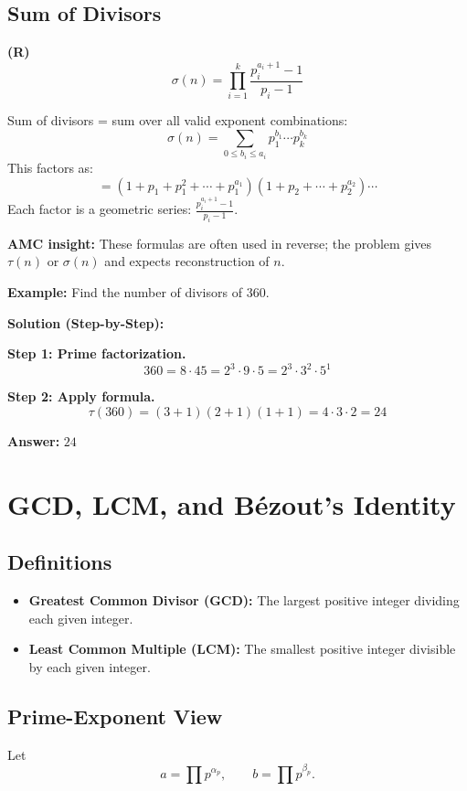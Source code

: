 \documentclass[12pt]{extarticle}
\begin{document}
\subsection*{Sum of Divisors}
\textbf{(R)}
\[
\sigma(n) = \prod_{i=1}^k \frac{p_i^{a_i+1}-1}{p_i-1}
\]

\begin{conceptbox}[Derivation]
Sum of divisors = sum over all valid exponent combinations:
\[
\sigma(n) = \sum_{0 \le b_i \le a_i} p_1^{b_1} \cdots p_k^{b_k}
\]
This factors as:
\[
= (1+p_1+p_1^2+\cdots+p_1^{a_1})(1+p_2+\cdots+p_2^{a_2})\cdots
\]
Each factor is a geometric series: $\frac{p_i^{a_i+1}-1}{p_i-1}$.
\end{conceptbox}

\begin{remarkbox}
\textbf{AMC insight:} These formulas are often used in reverse; the problem gives $\tau(n)$ or $\sigma(n)$ and expects reconstruction of $n$.
\end{remarkbox}

\begin{examplebox}
\textbf{Example:} Find the number of divisors of $360$.

\textbf{Solution (Step-by-Step):}

\textbf{Step 1: Prime factorization.}
\[
360 = 8 \cdot 45 = 2^3 \cdot 9 \cdot 5 = 2^3 \cdot 3^2 \cdot 5^1
\]

\textbf{Step 2: Apply formula.}
\[
\tau(360) = (3+1)(2+1)(1+1) = 4 \cdot 3 \cdot 2 = 24
\]

\textbf{Answer:} $\boxed{24}$
\end{examplebox}

\section{GCD, LCM, and Bézout’s Identity}

\subsection*{Definitions}
\begin{itemize}
\item \textbf{Greatest Common Divisor (GCD):} The largest positive integer dividing each given integer.
\item \textbf{Least Common Multiple (LCM):} The smallest positive integer divisible by each given integer.
\end{itemize}

\subsection*{Prime-Exponent View}
Let
\[
a=\prod p^{\alpha_p}, \qquad b=\prod p^{\beta_p}.
\]
\end{document}

